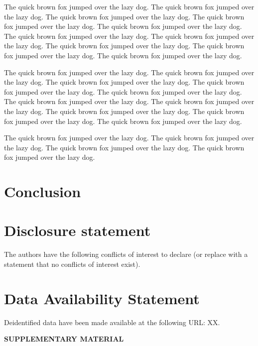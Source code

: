 \documentclass[
  12pt]{article}
\begin{document}
The quick brown fox jumped over the lazy dog. The quick brown fox jumped
over the lazy dog. The quick brown fox jumped over the lazy dog. The
quick brown fox jumped over the lazy dog. The quick brown fox jumped
over the lazy dog. The quick brown fox jumped over the lazy dog. The
quick brown fox jumped over the lazy dog. The quick brown fox jumped
over the lazy dog. The quick brown fox jumped over the lazy dog. The
quick brown fox jumped over the lazy dog.

The quick brown fox jumped over the lazy dog. The quick brown fox jumped
over the lazy dog. The quick brown fox jumped over the lazy dog. The
quick brown fox jumped over the lazy dog. The quick brown fox jumped
over the lazy dog. The quick brown fox jumped over the lazy dog. The
quick brown fox jumped over the lazy dog. The quick brown fox jumped
over the lazy dog. The quick brown fox jumped over the lazy dog. The
quick brown fox jumped over the lazy dog.

The quick brown fox jumped over the lazy dog. The quick brown fox jumped
over the lazy dog. The quick brown fox jumped over the lazy dog. The
quick brown fox jumped over the lazy dog.

\addtolength{\textheight}{-.2in}%

\section{Conclusion}\label{sec-conc}

\section{Disclosure statement}\label{disclosure-statement}

The authors have the following conflicts of interest to declare (or
replace with a statement that no conflicts of interest exist).

\section{Data Availability Statement}\label{data-availability-statement}

Deidentified data have been made available at the following URL: XX.

\label{supplementary-material}
\bigskip

\begin{center}

{\large\bf SUPPLEMENTARY MATERIAL}

\end{center}
\end{document}
